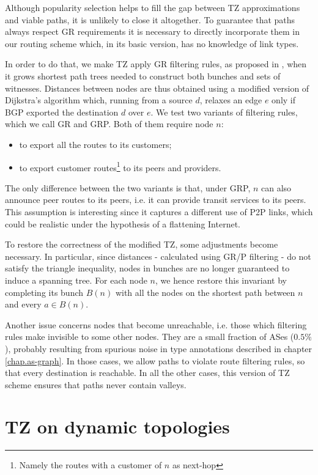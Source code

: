 \documentclass[a4paper,11pt,oneside]{report}
\begin{document}
\bigskip
Although popularity selection helps to fill the gap between TZ approximations and viable paths, it is unlikely to close it altogether. To guarantee that paths always respect GR requirements it is necessary to directly incorporate them in our routing scheme which, in its basic version, has no knowledge of link types. 

\bigskip
In order to do that, we make TZ apply GR filtering rules, as proposed in \cite{lixingaoStableInternetRouting2001}, when it grows shortest path trees needed to construct both bunches and sets of witnesses.
Distances between nodes are thus obtained using a modified version of Dijkstra's algorithm which, running from a source $d$, relaxes an edge $e$ only if BGP exported the destination $d$ over $e$. We test two variants of filtering rules, which we call GR and GRP. Both of them require node $n$:
\begin{itemize}
\item to export all the routes to its customers;
\item to export customer routes\footnote{Namely the routes with a customer of $n$ as next-hop} to its peers and providers.
\end{itemize}
The only difference between the two variants is that, under GRP, $n$ can also announce peer routes to its peers, i.e. it can provide transit services to its peers. This assumption is interesting since it captures a different use of P2P links, which could be realistic under the hypothesis of a flattening Internet.

\bigskip
To restore the correctness of the modified TZ, some adjustments become necessary. In particular, since distances - calculated using GR/P filtering - do not satisfy the triangle inequality, nodes in bunches are no longer guaranteed to induce a spanning tree. For each node $n$, we hence restore this invariant by completing its bunch $B(n)$ with all the nodes on the shortest path between $n$ and every $a \in B(n)$.

Another issue concerns nodes that become unreachable, i.e. those which filtering rules make invisible to some other nodes. They are a small fraction of ASes ($0.5\%$), probably resulting from spurious noise in type annotations described in chapter \ref{chap.as-graph}. In those cases, we allow paths to violate route filtering rules, so that every destination is reachable.
In all the other cases, this version of TZ scheme ensures that paths never contain valleys.

\chapter{TZ on dynamic topologies}
\label{chap.dyn_topology}
\end{document}
